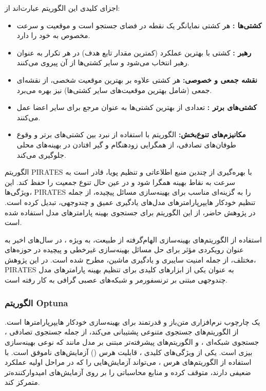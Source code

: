 اجزای کلیدی این الگوریتم عبارت‌اند از:
\begin{itemize}
    \item \textbf{کشتی‌ها :} هر کشتی نمایانگر یک نقطه در فضای جستجو است و موقعیت و سرعت مخصوص به خود را دارد.
    \item \textbf{رهبر :} کشتی با بهترین عملکرد (کمترین مقدار تابع هدف) در هر تکرار به عنوان رهبر انتخاب می‌شود و سایر کشتی‌ها از آن پیروی می‌کنند.
    \item \textbf{نقشه جمعی و خصوصی:} هر کشتی علاوه بر بهترین موقعیت شخصی، از نقشه‌ای جمعی (شامل بهترین موقعیت‌های سایر کشتی‌ها) نیز بهره می‌برد.
    \item \textbf{کشتی‌های برتر :} تعدادی از بهترین کشتی‌ها به عنوان مرجع برای سایر اعضا عمل می‌کنند.
    \item \textbf{مکانیزم‌های تنوع‌بخش:} الگوریتم با استفاده از نبرد بین کشتی‌های برتر و وقوع طوفان‌های تصادفی، از همگرایی زودهنگام و گیر افتادن در بهینه‌های محلی جلوگیری می‌کند.
\end{itemize}

الگوریتم PIRATES با بهره‌گیری از چندین منبع اطلاعاتی و تنظیم پویا، قادر است به سرعت به نقاط بهینه همگرا شود و در عین حال تنوع جمعیت را حفظ کند. این ویژگی‌ها، PIRATES را به گزینه‌ای مناسب برای بهینه‌سازی مسائل پیچیده، از جمله تنظیم خودکار هایپرپارامترهای مدل‌های یادگیری عمیق و چندوجهی، تبدیل کرده است. در پژوهش حاضر، از این الگوریتم برای جستجوی بهینه پارامترهای مدل استفاده شده است.

استفاده از الگوریتم‌های بهینه‌سازی الهام‌گرفته از طبیعت، به ویژه ، در سال‌های اخیر به عنوان رویکردی مؤثر برای حل مسائل بهینه‌سازی غیرخطی و پیچیده در حوزه‌های مختلف، از جمله امنیت سایبری و یادگیری ماشین، مطرح شده است. در این پژوهش، PIRATES به عنوان یکی از ابزارهای کلیدی برای تنظیم بهینه پارامترهای مدل چندوجهی مبتنی بر ترنسفورمر و شبکه‌های عصبی گرافی به کار رفته است.

\subsubsection{الگوریتم Optuna}
 \cite{Optuna2019} یک چارچوب  نرم‌افزاری متن‌باز و قدرتمند برای بهینه‌سازی خودکار هایپرپارامترها است.  از الگوریتم‌های جستجوی متنوعی پشتیبانی می‌کند، از جمله جستجوی تصادفی ، جستجوی شبکه‌ای ، و الگوریتم‌های پیشرفته‌تر مبتنی بر مدل مانند  که نوعی بهینه‌سازی بیزی است. یکی از ویژگی‌های کلیدی ، قابلیت هرس () آزمایش‌های ناموفق است. با استفاده از الگوریتم‌های هرس ،  می‌تواند آزمایش‌هایی را که در مراحل اولیه عملکرد ضعیفی دارند، متوقف کرده و منابع محاسباتی را بر روی آزمایش‌های امیدوارکننده‌تر متمرکز کند.

